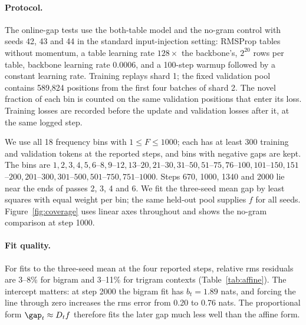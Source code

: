 \paragraph{Protocol.}
The online-gap tests use the both-table model and the no-gram control with seeds 42, 43 and 44 in the standard input-injection setting: RMSProp tables without momentum, a table learning rate $128\times$ the backbone's, $2^{20}$ rows per table, backbone learning rate $0.0006$, and a 100-step warmup followed by a constant learning rate. Training replays shard 1; the fixed validation pool contains 589,824 positions from the first four batches of shard 2. The novel fraction of each bin is counted on the same validation positions that enter its loss. Training losses are recorded before the update and validation losses after it, at the same logged step.

We use all 18 frequency bins with $1\le F\le1000$; each has at least 300 training and validation tokens at the reported steps, and bins with negative gaps are kept. The bins are $1,2,3,4,5,6$--$8,9$--$12,13$--$20,21$--$30,31$--$50,51$--$75,76$--$100,101$--$150,151$--$200,201$--$300,301$--$500,501$--$750,751$--$1000$. Steps 670, 1000, 1340 and 2000 lie near the ends of passes 2, 3, 4 and 6. We fit the three-seed mean gap by least squares with equal weight per bin; the same held-out pool supplies $f$ for all seeds. Figure~\ref{fig:coverage} uses linear axes throughout and shows the no-gram comparison at step 1000.

\paragraph{Fit quality.}
For fits to the three-seed mean at the four reported steps, relative rms residuals are 3--8\% for bigram and 3--11\% for trigram contexts (Table~\ref{tab:affine}). The intercept matters: at step 2000 the bigram fit has $b_t=1.89$ nats, and forcing the line through zero increases the rms error from 0.20 to 0.76 nats. The proportional form $\gap_t\approx D_tf$ therefore fits the later gap much less well than the affine form.

